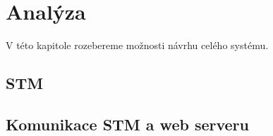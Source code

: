 \chapter{Analýza}

V této kapitole rozebereme možnosti návrhu celého systému.

\section{STM}




\section{Komunikace STM a web serveru}

